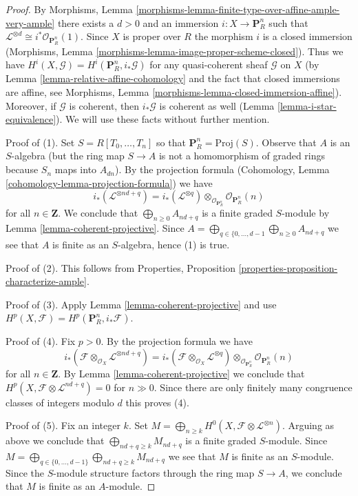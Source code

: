 \begin{proof}
By
Morphisms, Lemma \ref{morphisms-lemma-finite-type-over-affine-ample-very-ample}
there exists a $d > 0$ and an immersion $i : X \to \mathbf{P}^n_R$
such that $\mathcal{L}^{\otimes d} \cong i^*\mathcal{O}_{\mathbf{P}^n_R}(1)$.
Since $X$ is proper over $R$ the morphism $i$ is a closed immersion
(Morphisms, Lemma \ref{morphisms-lemma-image-proper-scheme-closed}).
Thus we have $H^i(X, \mathcal{G}) = H^i(\mathbf{P}^n_R, i_*\mathcal{G})$
for any quasi-coherent sheaf $\mathcal{G}$ on $X$
(by Lemma \ref{lemma-relative-affine-cohomology} and the fact that
closed immersions are affine, see
Morphisms, Lemma \ref{morphisms-lemma-closed-immersion-affine}).
Moreover, if $\mathcal{G}$ is coherent, then $i_*\mathcal{G}$
is coherent as well (Lemma \ref{lemma-i-star-equivalence}).
We will use these facts without further mention.

\medskip\noindent
Proof of (1). Set $S = R[T_0, \ldots, T_n]$ so that
$\mathbf{P}^n_R = \text{Proj}(S)$.
Observe that $A$ is an $S$-algebra (but the ring map $S \to A$ is not
a homomorphism of graded rings because $S_n$ maps into $A_{dn}$).
By the projection formula
(Cohomology, Lemma \ref{cohomology-lemma-projection-formula})
we have
$$
i_*(\mathcal{L}^{\otimes nd + q}) =
i_*(\mathcal{L}^{\otimes q})
\otimes_{\mathcal{O}_{\mathbf{P}^n_R}}
\mathcal{O}_{\mathbf{P}^n_R}(n)
$$
for all $n \in \mathbf{Z}$. We conclude that $\bigoplus_{n \geq 0} A_{nd + q}$
is a finite graded $S$-module by Lemma \ref{lemma-coherent-projective}.
Since
$A = \bigoplus_{q \in \{0, \ldots, d - 1} \bigoplus_{n \geq 0} A_{nd + q}$
we see that $A$ is finite as an $S$-algebra, hence (1) is true.

\medskip\noindent
Proof of (2). This follows from
Properties, Proposition \ref{properties-proposition-characterize-ample}.

\medskip\noindent
Proof of (3). Apply Lemma \ref{lemma-coherent-projective}
and use $H^p(X, \mathcal{F}) = H^p(\mathbf{P}^n_R, i_*\mathcal{F})$.

\medskip\noindent
Proof of (4). Fix $p > 0$. By the projection formula we have
$$
i_*(\mathcal{F} \otimes_{\mathcal{O}_X} \mathcal{L}^{\otimes nd + q}) =
i_*(\mathcal{F} \otimes_{\mathcal{O}_X} \mathcal{L}^{\otimes q})
\otimes_{\mathcal{O}_{\mathbf{P}^n_R}}
\mathcal{O}_{\mathbf{P}^n_R}(n)
$$
for all $n \in \mathbf{Z}$. By Lemma \ref{lemma-coherent-projective}
we conclude that $H^p(X, \mathcal{F} \otimes \mathcal{L}^{nd + q}) = 0$
for $n \gg 0$. Since there are only finitely many congruence classes
of integers modulo $d$ this proves (4).

\medskip\noindent
Proof of (5). Fix an integer $k$. Set
$M = \bigoplus_{n \geq k} H^0(X, \mathcal{F} \otimes \mathcal{L}^{\otimes n})$.
Arguing as above we conclude that $\bigoplus_{nd + q \geq k} M_{nd + q}$
is a finite graded $S$-module. Since
$M = \bigoplus_{q \in \{0, \ldots, d - 1\}}
\bigoplus_{nd + q \geq k} M_{nd + q}$
we see that $M$ is finite as an $S$-module. Since the $S$-module structure
factors through the ring map $S \to A$, we conclude that $M$ is finite
as an $A$-module.
\end{proof}


